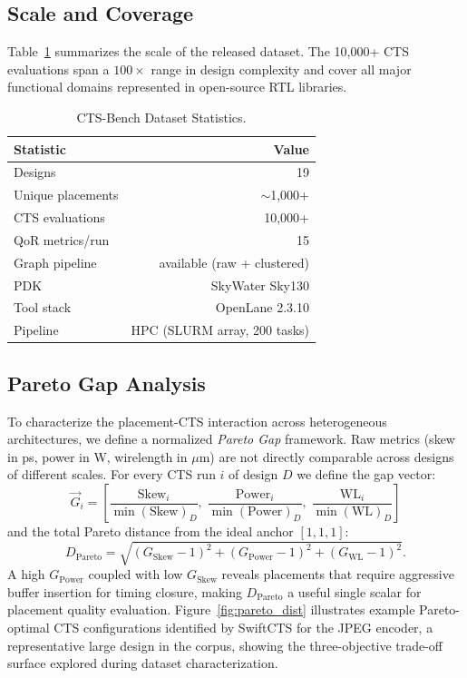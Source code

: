 \documentclass[acmsmall,review,anonymous]{acmart}
\begin{document}
\subsection{Scale and Coverage}

Table~\ref{tab:stats} summarizes the scale of the released dataset.
The 10,000+ CTS evaluations span a $100\times$ range in design complexity
and cover all major functional domains represented in open-source RTL libraries.

\begin{table}[htbp]
\centering
\small
\caption{CTS-Bench Dataset Statistics.}
\label{tab:stats}
\begin{tabular}{lr}
\toprule
\textbf{Statistic} & \textbf{Value} \\
\midrule
Designs              & 19 \\
Unique placements    & $\sim$1{,}000+ \\
CTS evaluations      & 10{,}000+ \\
QoR metrics/run      & 15 \\
Graph pipeline       & available (raw + clustered) \\
PDK                  & SkyWater Sky130 \\
Tool stack           & OpenLane 2.3.10 \\
Pipeline             & HPC (SLURM array, 200 tasks) \\
\bottomrule
\end{tabular}
\end{table}

\subsection{Pareto Gap Analysis}

To characterize the placement-CTS interaction across heterogeneous
architectures, we define a normalized \emph{Pareto Gap} framework.
Raw metrics (skew in ps, power in W, wirelength in $\mu$m) are not
directly comparable across designs of different scales. For every CTS run $i$
of design $D$ we define the gap vector:
\begin{equation}
  \vec{G}_i = \left[
    \frac{\text{Skew}_i}{\min(\text{Skew})_D},\;
    \frac{\text{Power}_i}{\min(\text{Power})_D},\;
    \frac{\text{WL}_i}{\min(\text{WL})_D}
  \right]
\end{equation}
and the total Pareto distance from the ideal anchor $[1,1,1]$:
\begin{equation}
  D_\text{Pareto} = \sqrt{(G_\text{Skew}-1)^2 + (G_\text{Power}-1)^2 +
                          (G_\text{WL}-1)^2}.
\end{equation}
A high $G_\text{Power}$ coupled with low $G_\text{Skew}$ reveals placements
that require aggressive buffer insertion for timing closure, making
$D_\text{Pareto}$ a useful single scalar for placement quality evaluation.
Figure~\ref{fig:pareto_dist} illustrates example Pareto-optimal CTS
configurations identified by SwiftCTS for the JPEG encoder, a representative
large design in the corpus, showing the three-objective trade-off surface
explored during dataset characterization.
\end{document}
